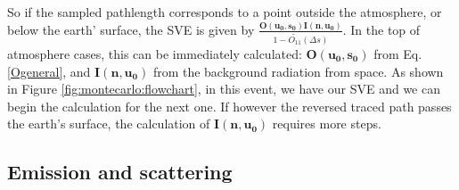So if the sampled pathlength corresponds to a point outside the
atmosphere, or below the earth' surface, the SVE is given by
$\frac{\mathbf{O(u_0,s_0)I(n,u_0)}}{1-\tilde{O_{11}}(\Delta s)}$. In the
top of atmosphere cases, this can be immediately calculated:
$\mathbf{O(u_0,s_0)}$ from Eq. \ref{Ogeneral}, and $\mathbf{I(n,u_0)}$ from
the background radiation from space.  As shown in Figure
\ref{fig:montecarlo:flowchart}, in this event, we have our SVE and we can begin
the calculation for the next one.  If however the reversed traced path passes
the earth's surface, the calculation of $\mathbf{I(n,u_0)}$ requires more
steps.

\subsection{Emission and scattering}

